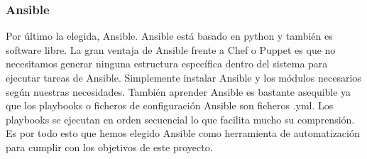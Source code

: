 		\subsubsection{Ansible}
			\begin{text}
				Por último la elegida, Ansible. Ansible está basado en python y también es software libre. La gran ventaja de Ansible frente a Chef o Puppet es que no necesitamos generar ninguna estructura específica dentro del sistema para ejecutar tareas de Ansible. Simplemente instalar Ansible y los módulos necesarios según nuestras necesidades. También aprender Ansible es bastante asequible ya que los playbooks o ficheros de configuración Ansible son ficheros .yml. Los playbooks se ejecutan en orden secuencial lo que facilita mucho su comprensión. Es por todo esto que hemos elegido Ansible como herramienta de automatización para cumplir con los objetivos de este proyecto. \cite{ansible:online}
			\end{text}
		